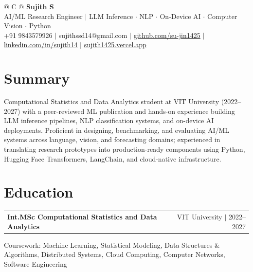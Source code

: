 \documentclass[a4paper,10pt]{article}
\newcommand{\ulink}[2]{\href{#1}{\uline{#2}}}
\newcommand{\subheading}[1]{{\color[HTML]{0A0A0A}\fontsize{11}{13}\selectfont\bfseries #1}}
\newcommand{\meta}[1]{{\color[HTML]{5C5C5C}\fontsize{9.5}{11.5}\selectfont #1}}
\begin{document}
\pagestyle{empty}

\begin{tabularx}{\linewidth}{@{} C @{}}
{\color[HTML]{000000}\fontsize{26}{31}\selectfont\bfseries Sujith S} \\[4pt]
{\fontsize{10}{12}\selectfont\color[HTML]{3A3A3A}
AI/ML Research Engineer $|$ LLM Inference $\cdot$ NLP $\cdot$ On-Device AI $\cdot$ Computer Vision $\cdot$ Python} \\[4pt]
{\fontsize{10}{12}\selectfont\textcolor[HTML]{3A3A3A}{
+91 9843579926 $|$
sujithssd14@gmail.com $|$
\ulink{https://github.com/su-jin1425}{github.com/su-jin1425} $|$
\ulink{https://linkedin.com/in/sujith14}{linkedin.com/in/sujith14} $|$
\ulink{https://sujith1425.vercel.app}{sujith1425.vercel.app}}}
\end{tabularx}

\vspace{2pt}

\section{Summary}
\vspace{2pt}
{\color[HTML]{0A0A0A}\fontsize{10}{13}\selectfont
Computational Statistics and Data Analytics student at VIT University (2022--2027) with a peer-reviewed ML publication and hands-on experience building LLM inference pipelines, NLP classification systems, and on-device AI deployments. Proficient in designing, benchmarking, and evaluating AI/ML systems across language, vision, and forecasting domains; experienced in translating research prototypes into production-ready components using Python, Hugging Face Transformers, LangChain, and cloud-native infrastructure.}

\vspace{2pt}

\section{Education}
\vspace{2pt}

\begin{tabularx}{\linewidth}{@{}X r@{}}
\subheading{Int.MSc Computational Statistics and Data Analytics} & \meta{VIT University $|$ 2022--2027}
\end{tabularx}
\vspace{1pt}
{\color[HTML]{3A3A3A}\fontsize{10}{13}\selectfont Coursework: Machine Learning, Statistical Modeling, Data Structures \& Algorithms, Distributed Systems, Cloud Computing, Computer Networks, Software Engineering}
\end{document}
